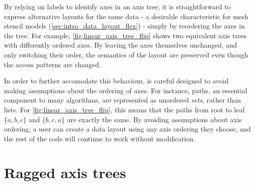 \documentclass[thesis]{subfiles}
\begin{document}
By relying on labels to identify axes in an axis tree, it is straightforward to express alternative layouts for the same data - a desirable characteristic for mesh stencil models (\cref{sec:intro_data_layout_flex}) - simply by reordering the axes in the tree.
For example, \cref{fig:linear_axis_tree_flip} shows two equivalent axis trees with differently ordered axes.
By leaving the axes themselves unchanged, and only switching their order, the semantics of the layout are preserved even though the access patterns are changed.

In order to further accomodate this behaviour,  is careful designed to avoid making assumptions about the ordering of axes.
For instance, paths, an essential component to many algorithms, are represented as unordered \emph{sets}, rather than lists.
For \cref{fig:linear_axis_tree_flip}, this means that the paths from root to leaf $\{ a, b, c \}$ and $\{ b, c, a \}$ are exactly the same.
By avoiding assumptions about axis ordering, a user can create a data layout using any axis ordering they choose, and the rest of the code will continue to work without modification.

\section{Ragged axis trees}
\label{sec:ragged_axis_trees}
\end{document}
